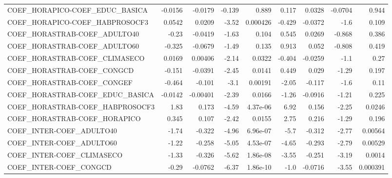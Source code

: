 \begin{tabular}{lrrrrrrrr}
COEF\_HORAPICO-COEF\_EDUC\_BASICA        &     -0.0156 &      -0.0179 &   -0.139 &    0.889 &      0.117 &      0.0328 &      -0.0704 &         0.944 \\
COEF\_HORAPICO-COEF\_HABPROSOCF3        &      0.0542 &       0.0209 &    -3.52 & 0.000426 &     -0.429 &     -0.0372 &         -1.6 &         0.109 \\
COEF\_HORASTRAB-COEF\_ADULTO40          &       -0.23 &      -0.0419 &    -1.63 &    0.104 &      0.545 &      0.0269 &       -0.868 &         0.386 \\
COEF\_HORASTRAB-COEF\_ADULTO60          &      -0.325 &      -0.0679 &    -1.49 &    0.135 &      0.913 &       0.052 &       -0.808 &         0.419 \\
COEF\_HORASTRAB-COEF\_CLIMASECO         &      0.0169 &      0.00406 &    -2.14 &   0.0322 &     -0.404 &     -0.0259 &         -1.1 &          0.27 \\
COEF\_HORASTRAB-COEF\_CONGCD            &      -0.151 &      -0.0391 &    -2.45 &   0.0141 &      0.449 &       0.029 &        -1.29 &         0.197 \\
COEF\_HORASTRAB-COEF\_CONGEF            &      -0.464 &       -0.101 &     -3.1 &  0.00191 &      -2.05 &      -0.117 &         -1.6 &          0.11 \\
COEF\_HORASTRAB-COEF\_EDUC\_BASICA       &     -0.0142 &     -0.00401 &    -2.39 &   0.0166 &      -1.26 &     -0.0916 &        -1.21 &         0.225 \\
COEF\_HORASTRAB-COEF\_HABPROSOCF3       &        1.83 &        0.173 &    -4.59 & 4.37e-06 &       6.92 &       0.156 &        -2.25 &        0.0246 \\
COEF\_HORASTRAB-COEF\_HORAPICO          &       0.345 &        0.107 &    -2.42 &   0.0155 &       2.75 &       0.216 &        -1.29 &         0.196 \\
COEF\_INTER-COEF\_ADULTO40              &       -1.74 &       -0.322 &    -4.96 & 6.96e-07 &       -5.7 &      -0.312 &        -2.77 &       0.00564 \\
COEF\_INTER-COEF\_ADULTO60              &       -1.22 &       -0.258 &    -5.05 & 4.53e-07 &      -4.65 &      -0.293 &        -2.79 &       0.00529 \\
COEF\_INTER-COEF\_CLIMASECO             &       -1.33 &       -0.326 &    -5.62 & 1.86e-08 &      -3.55 &      -0.251 &        -3.19 &        0.0014 \\
COEF\_INTER-COEF\_CONGCD                &       -0.29 &      -0.0762 &    -6.37 & 1.86e-10 &       -1.0 &     -0.0716 &        -3.55 &      0.000391 \\

\end{tabular}
